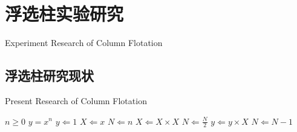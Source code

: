 \chapter{浮选柱实验研究}{Experiment Research of Column Flotation}
\section{浮选柱研究现状}{Present Research of Column Flotation}
\begin{algorithmic}
    \BeginBox
        \Require $n \geq 0$
        \Ensure $y = x^n$
        \State $y \Leftarrow 1$
        \State $X \Leftarrow x$
        \State $N \Leftarrow n$
        \State $X \Leftarrow X \times X$
        \State $N \Leftarrow \frac{N}{2} $  
        \State $y \Leftarrow y \times X$
        \State $N \Leftarrow N - 1$
        \EndIf
        \EndWhile
    \EndBox
\end{algorithmic}